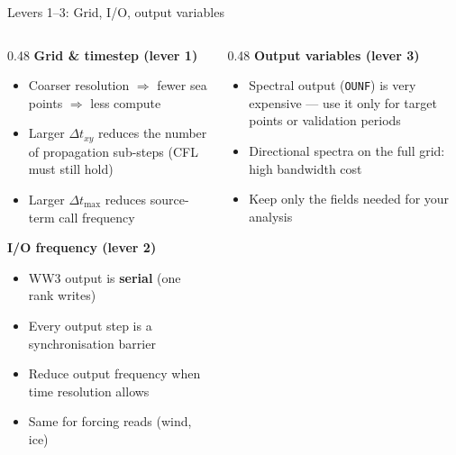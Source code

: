 \documentclass[aspectratio=169,10pt]{beamer}
\begin{document}
\begin{frame}[shrink=10]{Levers 1--3: Grid, I/O, output variables}

  \begin{columns}[T]
    \begin{column}{0.48\textwidth}
      \textbf{Grid \& timestep (lever 1)}
      \begin{itemize}
        \item Coarser resolution $\Rightarrow$ fewer sea points $\Rightarrow$ less compute
        \item Larger $\Delta t_{xy}$ reduces the number of propagation sub-steps
              (CFL must still hold)
        \item Larger $\Delta t_{\max}$ reduces source-term call frequency
      \end{itemize}

      \vspace{0.5em}
      \textbf{I/O frequency (lever 2)}
      \begin{itemize}
        \item WW3 output is \textbf{serial} (one rank writes)
        \item Every output step is a synchronisation barrier
        \item Reduce output frequency when time resolution allows
        \item Same for forcing reads (wind, ice)
      \end{itemize}
    \end{column}
    \begin{column}{0.48\textwidth}
      \textbf{Output variables (lever 3)}
      \begin{itemize}
        \item Spectral output (\texttt{OUNF}) is very expensive ---
              use it only for target points or validation periods
        \item Directional spectra on the full grid: high bandwidth cost
        \item Keep only the fields needed for your analysis
      \end{itemize}

    \end{column}
  \end{columns}
\end{frame}
\end{document}
